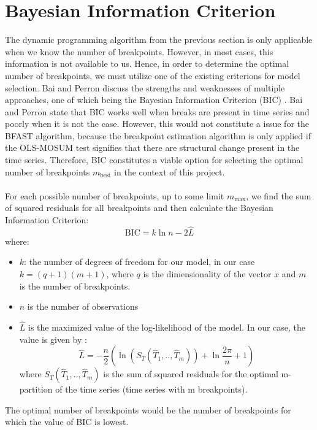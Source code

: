 \documentclass[main.tex]{subfiles}
\begin{document}
\section{Bayesian Information Criterion}
\label{sec:bayesian_information_criterion}
The dynamic programming algorithm from the previous section is only applicable when we know
the number of breakpoints. However, in most cases, this information is not available to us.
Hence, in order to determine the optimal number of breakpoints, we must utilize
one of the existing criterions for model selection. Bai and Perron \cite{bai_perron} discuss
the strengths and weaknesses of multiple approaches, one of which being
the Bayesian Information Criterion (BIC) \cite{schwarz1978}.
Bai and Perron state that BIC works well when breaks are present
in time series and poorly when it is not the case. However, this would not
constitute a issue for
the BFAST algorithm, because the breakpoint estimation algorithm is only applied if
the OLS-MOSUM test signifies that there are structural change present in the
time series. Therefore, BIC constitutes a viable option for selecting the
optimal number of breakpoints $m_{\text{best}}$ in the context of this project.\\\\
For each possible number of breakpoints, up to some
limit $m_{\text{max}}$, we find the sum of squared residuals for all breakpoints
and
then calculate the Bayesian Information Criterion:
\[
\text{BIC} = k \ln{n} - 2 {\hat{L}}
\]
where:
\begin{itemize}
\item $k$: the number of degrees of freedom for our model, in our case
  $k = (q + 1) (m + 1)$, where $q$ is the dimensionality of the vector $x$ and
  $m$ is the number of breakpoints.
\item $n$ is the number of observations
\item $\hat{L}$ is the maximized value of the log-likelihood of the model. In our case,
  the value is given by \cite{yao1988}:
  \[
  \hat{L} = -\frac{n}{2} \left(\ln \left(S_T(\hat{T}_1,..,\hat{T}_m)\right)
  + \ln{\frac{2\pi}{n}} + 1\right)
  \]
  where $S_T(\hat{T}_1,..,\hat{T}_m)$ is the sum of squared residuals for the
  optimal m-partition of the time series (time series with m breakpoints). 
\end{itemize}
The optimal number of breakpoints would be the number of breakpoints for which
the value of BIC is lowest.
\end{document}
